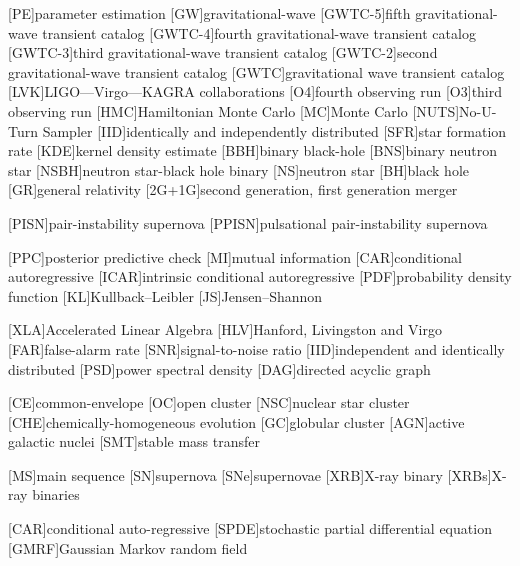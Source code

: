 [PE]{parameter estimation}
[GW]{gravitational-wave}
[GWTC-5]{fifth gravitational-wave transient catalog}
[GWTC-4]{fourth gravitational-wave transient catalog}
[GWTC-3]{third gravitational-wave transient catalog}
[GWTC-2]{second gravitational-wave transient catalog}
[GWTC]{gravitational wave transient catalog}
[LVK]{LIGO---Virgo---KAGRA collaborations}
[O4]{fourth observing run}
[O3]{third observing run}
[HMC]{Hamiltonian Monte Carlo}
[MC]{Monte Carlo}
[NUTS]{No-U-Turn Sampler}
[IID]{identically and independently distributed}
[SFR]{star formation rate}
[KDE]{kernel density estimate}
[BBH]{binary black-hole}
[BNS]{binary neutron star}
[NSBH]{neutron star-black hole binary}
[NS]{neutron star}
[BH]{black hole}
[GR]{general relativity}
[2G+1G]{second generation, first generation merger}

[PISN]{pair-instability supernova}
[PPISN]{pulsational pair-instability supernova}    



[PPC]{posterior predictive check}
[MI]{mutual information}
[CAR]{conditional autoregressive}
[ICAR]{intrinsic conditional autoregressive}
[PDF]{probability density function}
[KL]{Kullback--Leibler}
[JS]{Jensen--Shannon}

[XLA]{Accelerated Linear Algebra}
[HLV]{Hanford, Livingston and Virgo}
[FAR]{false-alarm rate}
[SNR]{signal-to-noise ratio}
[IID]{independent and identically distributed}
[PSD]{power spectral density}
[DAG]{directed acyclic graph}


% 
%
[CE]{common-envelope}
[OC]{open cluster}
[NSC]{nuclear star cluster}
[CHE]{chemically-homogeneous evolution}
[GC]{globular cluster}
[AGN]{active galactic nuclei}
[SMT]{stable mass transfer}

[MS]{main sequence}
[SN]{supernova}
[SNe]{supernovae}
[XRB]{X-ray binary}
[XRBs]{X-ray binaries}



[CAR]{conditional auto-regressive}
[SPDE]{stochastic partial differential equation}
[GMRF]{Gaussian Markov random field}
